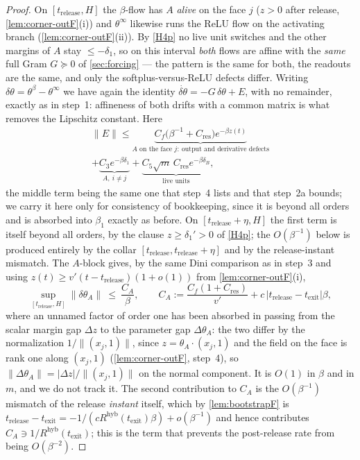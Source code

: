 \documentclass[11pt]{article}
\theoremstyle{definition}
\theoremstyle{remark}
\newcommand{\texit}{t_{\mathrm{exit}}}
\newcommand{\trel}{t_{\mathrm{release}}}
\newcommand{\hyb}{\mathrm{hyb}}
\begin{document}
\begin{proof}
On $[\trel,H]$ the $\beta$-flow has $A$ \emph{alive} on the face $j$ ($z>0$
after release, \cref{lem:corner-outF}(i)) and $\theta^\infty$ likewise runs the
ReLU flow on the activating branch (\cref{lem:corner-outF}(ii)). By \eqref{H4p} no
live unit switches and the other margins of $A$ stay $\le-\delta_1$, so on this
interval \emph{both} flows are affine with the \emph{same} full Gram $G\succeq0$
of \cref{sec:forcing} --- the pattern is the same for both, the readouts are the
same, and only the softplus-versus-ReLU defects differ. Writing
$\delta\theta=\theta^\beta-\theta^\infty$ we have again the identity
$\dot{\delta\theta}=-G\,\delta\theta+E$, with no remainder, exactly as in
step~1: affineness of both drifts with a common matrix is what removes the
Lipschitz constant. Here
\begin{multline*}
\|E\|\le
\underbrace{C_f\bigl(\beta^{-1}+C_{\mathrm{res}}\bigr)e^{-\beta z(t)}}_{A\text{ on the face }j:\ \text{output and derivative defects}}\\
+\underbrace{C_3e^{-\beta\delta_1}}_{A,\ i\ne j}
+\underbrace{C_5\sqrt m\,C_{\mathrm{res}}e^{-\beta\delta_B}}_{\text{live units}} ,
\end{multline*}
the middle term being the same one that step~4 lists and that step~2a bounds; we
carry it here only for consistency of bookkeeping, since it is beyond all orders
and is absorbed into $\beta_1$ exactly as before. On $[\trel+\eta,H]$ the first
term is itself beyond all orders, by the clause $z\ge\delta_1'>0$ of \eqref{H4p};
the $O(\beta^{-1})$ below is produced entirely by the collar
$[\trel,\trel+\eta]$ and by the release-instant mismatch. The $A$-block gives,
by the same Dini comparison as in step~3 and using
$z(t)\ge v'(t-\trel)(1+o(1))$ from \cref{lem:corner-outF}(i),
\begin{equation}\label{eq:postrelA}
\sup_{[\trel,H]}\|\delta\theta_A\|\ \le\ \frac{C_A}{\beta},
\qquad
C_A:=\frac{C_f(1+C_{\mathrm{res}})}{v'}+c\,\bigl|\trel-\texit\bigr|\beta ,
\end{equation}
where an unnamed factor of order one has been absorbed in passing from the
scalar margin gap $\Delta z$ to the parameter gap $\Delta\theta_A$: the two
differ by the normalization $1/\|(x_j,1)\|$, since $z=\theta_A\cdot(x_j,1)$ and
the field on the face is rank one along $(x_j,1)$ (\cref{lem:corner-outF},
step~4), so $\|\Delta\theta_A\|=|\Delta z|/\|(x_j,1)\|$ on the normal component.
It is $O(1)$ in $\beta$ and in $m$, and we do not track it. The second
contribution to $C_A$ is the $O(\beta^{-1})$ mismatch of the release
\emph{instant} itself, which by \cref{lem:bootstrapF} is
$\trel-\texit=-1/(c R^{\hyb}(\texit)\beta)+o(\beta^{-1})$ and hence contributes
$C_A\ni 1/R^{\hyb}(\texit)$; this is the term that prevents the post-release
rate from being $O(\beta^{-2})$.


\end{proof}
\end{document}
